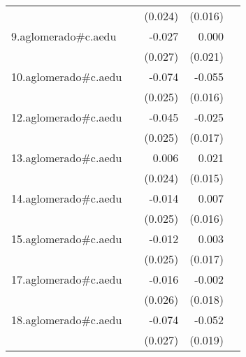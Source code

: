 {\begin{longtable}{l*{4}{D{.}{.}{-1}}}
            &                     &     (0.024)         &     (0.016)         &                     \\
\addlinespace
9.aglomerado#c.aedu&                     &      -0.027         &       0.000         &                     \\
            &                     &     (0.027)         &     (0.021)         &                     \\
\addlinespace
10.aglomerado#c.aedu&                     &      -0.074\sym{**} &      -0.055\sym{***}&                     \\
            &                     &     (0.025)         &     (0.016)         &                     \\
\addlinespace
12.aglomerado#c.aedu&                     &      -0.045         &      -0.025         &                     \\
            &                     &     (0.025)         &     (0.017)         &                     \\
\addlinespace
13.aglomerado#c.aedu&                     &       0.006         &       0.021         &                     \\
            &                     &     (0.024)         &     (0.015)         &                     \\
\addlinespace
14.aglomerado#c.aedu&                     &      -0.014         &       0.007         &                     \\
            &                     &     (0.025)         &     (0.016)         &                     \\
\addlinespace
15.aglomerado#c.aedu&                     &      -0.012         &       0.003         &                     \\
            &                     &     (0.025)         &     (0.017)         &                     \\
\addlinespace
17.aglomerado#c.aedu&                     &      -0.016         &      -0.002         &                     \\
            &                     &     (0.026)         &     (0.018)         &                     \\
\addlinespace
18.aglomerado#c.aedu&                     &      -0.074\sym{**} &      -0.052\sym{**} &                     \\
            &                     &     (0.027)         &     (0.019)         &                     \\

\end{longtable}}
